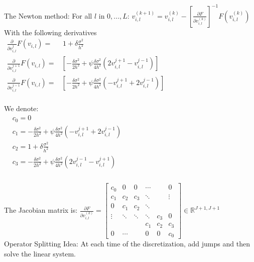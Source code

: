 \documentclass[8pt]{article}
\begin{document}
The Newton method: For all $l$ in ${0,...,L}$: $v^{(k+1)}_{i,l} =  v^{(k)}_{i,l} - \left[\frac{\partial{F}}{\partial{v^{(k)}_{i,l}}}\right]^{-1}F(v^{(k)}_{i,l})$ \\

With the following derivatives\\

$\begin{aligned}
\frac{\partial}{\partial v^j_{i,l}}F(v_{i,l}) = & \, 1 + \delta \frac{\sigma^2}{h^2} \,\\
\frac{\partial}{\partial v^{j+1}_{i,l}}F(v_{i,l}) = & \left[ -\frac{ \delta\sigma^2}{2h^2} + \psi \frac{\delta\sigma^2}{4h^2} (2v^{j+1}_{i,l} - v^{j-1}_{i,l}) \right] \, \\
\frac{\partial}{\partial v^{j-1}_{i,l}}F(v_{i,l}) = & \left[ -\frac{ \delta\sigma^2}{2h^2} + \psi \frac{\delta\sigma^2}{4h^2} (-v^{j+1}_{i,l} + 2v^{j-1}_{i,l}) \right]
\end{aligned}$ \\ \\

We denote:\\

$\begin{aligned}
& c_0 = 0 \\
&c_1 =  -\frac{ \delta\sigma^2}{2h^2} + \psi \frac{\delta\sigma^2}{4h^2} (-v_{i,l}^{j+1} + 2v_{i,l}^{j-1})\\
&c_2 = 1 + \delta \frac{\sigma^2}{h^2} \\
&c_3 = -\frac{ \delta\sigma^2}{2h^2} + \psi \frac{\delta\sigma^2}{4h^2} (2v_{i,l}^{j-1} - v_{i,l}^{j+1})\\
\end{aligned}$\\ \\

The Jacobian matrix is: $\frac{\partial{F}}{\partial{v^{(k)}_{i,l}}} = \begin{bmatrix}
c_0 & 0 & 0 & \cdots &  & 0 \\
c_1 & c_2 & c_3 & \ddots &  & \vdots \\
0 & c_1 & c_2 & \ddots &  &  \\
\vdots & \ddots & \ddots & \ddots & c_3 & 0 \\
 &  &  & c_1 & c_2 & c_3 \\
0 & \cdots &  & 0 & 0 & c_0
\end{bmatrix}
\in \mathbb{R}^{J+1,J+1}$\\


Operator Splitting Idea: At each time of the discretization, add jumps and then solve the linear system.\\
\end{document}
